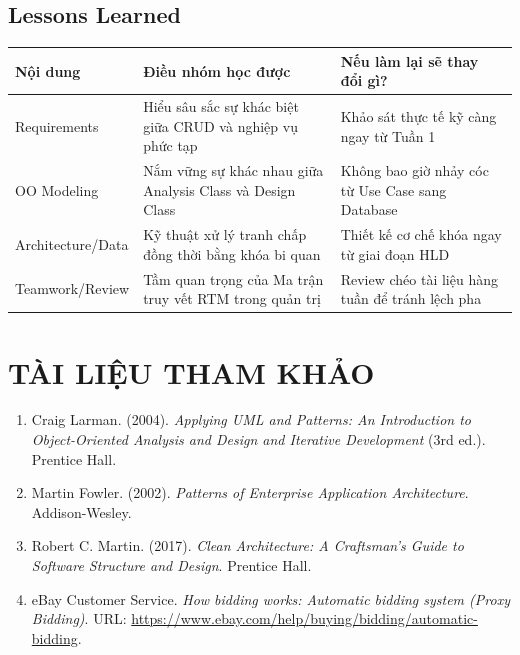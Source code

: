 \documentclass[11pt,a4paper]{article}
\begin{document}
\subsection{Lessons Learned}
\begin{table}[H]
    \centering
    \small
    \begin{tabularx}{\textwidth}{|l|X|X|}
        \hline
        \textbf{Nội dung} & \textbf{Điều nhóm học được} & \textbf{Nếu làm lại sẽ thay đổi gì?} \\ \hline
        Requirements & Hiểu sâu sắc sự khác biệt giữa CRUD và nghiệp vụ phức tạp & Khảo sát thực tế kỹ càng ngay từ Tuần 1 \\ \hline
        OO Modeling & Nắm vững sự khác nhau giữa Analysis Class và Design Class & Không bao giờ nhảy cóc từ Use Case sang Database \\ \hline
        Architecture/Data & Kỹ thuật xử lý tranh chấp đồng thời bằng khóa bi quan & Thiết kế cơ chế khóa ngay từ giai đoạn HLD \\ \hline
        Teamwork/Review & Tầm quan trọng của Ma trận truy vết RTM trong quản trị & Review chéo tài liệu hàng tuần để tránh lệch pha \\ \hline
    \end{tabularx}
\end{table}

\section*{TÀI LIỆU THAM KHẢO}
\begin{enumerate}[leftmargin=*]
    \item Craig Larman. (2004). \textit{Applying UML and Patterns: An Introduction to Object-Oriented Analysis and Design and Iterative Development} (3rd ed.). Prentice Hall.
    \item Martin Fowler. (2002). \textit{Patterns of Enterprise Application Architecture}. Addison-Wesley.
    \item Robert C. Martin. (2017). \textit{Clean Architecture: A Craftsman's Guide to Software Structure and Design}. Prentice Hall.
    \item eBay Customer Service. \textit{How bidding works: Automatic bidding system (Proxy Bidding)}. URL: \url{https://www.ebay.com/help/buying/bidding/automatic-bidding}.
\end{enumerate}
\end{document}
